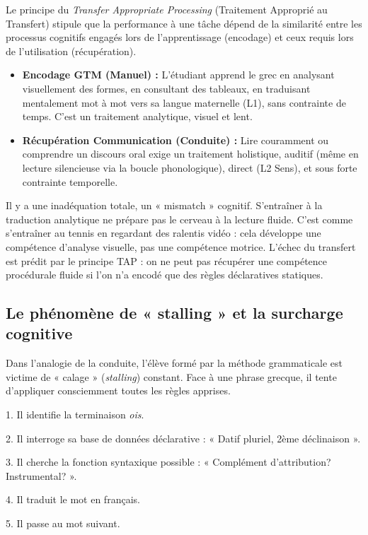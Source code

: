 Le principe du \textit{Transfer Appropriate Processing} (Traitement Approprié au Transfert) stipule
que la performance à une tâche dépend de la similarité entre les processus cognitifs engagés lors de
l'apprentissage (encodage) et ceux requis lors de l'utilisation (récupération).\cite{III-3-3-ref37}

\begin{itemize}\item \textbf{Encodage GTM (Manuel) :} L'étudiant apprend le grec en analysant visuellement des formes, en consultant des tableaux, en traduisant mentalement mot à mot vers sa langue maternelle (L1), sans contrainte de temps. C'est un traitement analytique, visuel et lent.\item \textbf{Récupération Communication (Conduite) :} Lire couramment ou comprendre un discours oral exige un traitement holistique, auditif (même en lecture silencieuse via la boucle phonologique), direct (L2 \-\> Sens), et sous forte contrainte temporelle.\end{itemize}Il y a une inadéquation totale, un « mismatch » cognitif. S'entraîner à la traduction analytique ne
prépare pas le cerveau à la lecture fluide. C'est comme s'entraîner au tennis en regardant des
ralentis vidéo : cela développe une compétence d'analyse visuelle, pas une compétence motrice.
L'échec du transfert est prédit par le principe TAP : on ne peut pas récupérer une compétence
procédurale fluide si l'on n'a encodé que des règles déclaratives statiques.\cite{III-3-3-ref36}



\subsection{Le phénomène de « stalling » et la surcharge cognitive}

Dans l'analogie de la conduite, l'élève formé par la méthode grammaticale est victime de « calage »
(\textit{stalling}) constant. Face à une phrase grecque, il tente d'appliquer consciemment toutes
les règles apprises.

1. Il identifie la terminaison \textit{\-ois}.

2. Il interroge sa base de données déclarative : « Datif pluriel, 2ème déclinaison ».

3. Il cherche la fonction syntaxique possible : « Complément d'attribution? Instrumental? ».

4. Il traduit le mot en français.

5. Il passe au mot suivant.

